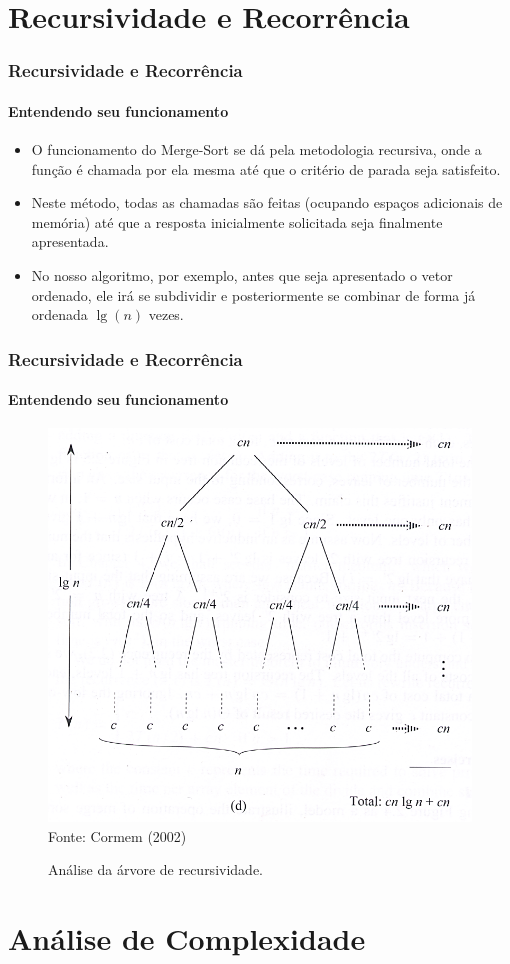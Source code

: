 \documentclass[aspectratio=169]{beamer}
\begin{document}
\section{Recursividade e Recorrência}

\begin{frame}
	\frametitle{Recursividade e Recorrência}
	\framesubtitle{Entendendo seu funcionamento}
	\begin{itemize}
		\item O funcionamento do Merge-Sort se dá pela metodologia recursiva, onde a função é chamada por ela mesma até que o critério de parada seja satisfeito.
		\item Neste método, todas as chamadas são feitas (ocupando espaços adicionais de memória) até que a resposta inicialmente solicitada seja finalmente apresentada.
		\item No nosso algoritmo, por exemplo, antes que seja apresentado o vetor ordenado, ele irá se subdividir e posteriormente se combinar de forma já ordenada $ \lg(n) $ vezes.
	\end{itemize}
\end{frame}

	\begin{frame}
	\frametitle{Recursividade e Recorrência}
	\framesubtitle{Entendendo seu funcionamento}
	\begin{figure}
		\centering
		\caption{Análise da árvore de recursividade.}
		\includegraphics[width=.37\linewidth]{quickbest.png}\\
		\footnotesize{Fonte: Cormem (2002)}
		\label{figtextimg}
	\end{figure} 
	\end{frame}
	


	\section{Análise de Complexidade}	
	
\end{document}
